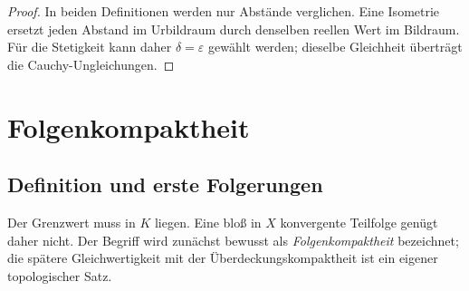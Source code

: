 \documentclass[main.tex]{subfiles}
\begin{document}
\begin{proof}
In beiden Definitionen werden nur Abstände verglichen. Eine Isometrie
ersetzt jeden Abstand im Urbildraum durch denselben reellen Wert im
Bildraum. Für die Stetigkeit kann daher \(\delta=\varepsilon\) gewählt
werden; dieselbe Gleichheit überträgt die Cauchy-Ungleichungen.
\end{proof}

\chapter{Folgenkompaktheit}

\section{Definition und erste Folgerungen}


Der Grenzwert muss in \(K\) liegen. Eine bloß in \(X\) konvergente Teilfolge
genügt daher nicht. Der Begriff wird zunächst bewusst als
\emph{Folgenkompaktheit} bezeichnet; die spätere Gleichwertigkeit mit der
Überdeckungskompaktheit ist ein eigener topologischer Satz.
\end{document}
